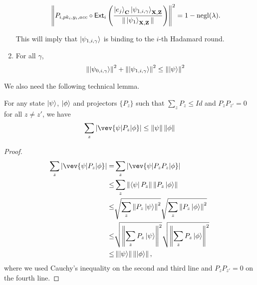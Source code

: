 \begin{lemma}
\begin{enumerate}
\begin{align}
     \left\lVert P_{i,pk_i,y_i,acc} \circ \mathsf{Ext}_i\left(\frac{\ket{e_j}_{\mathbf{C}}\ket{\psi_{1,i,\gamma}}_{\mathbf{X},\mathbf{Z}}}{\|\ket{\psi_1}_{\mathbf{X},\mathbf{Z}}\|}\right)\right\rVert^2 =1-\operatorname{negl}(\lambda).
\end{align}

This will imply that    $\ket{\psi_{1,i,\gamma}}$ is binding to the $i$-th Hadamard round.

\item \label{property-partition-norm-sum}
  For all $\gamma$,
  \begin{align}
    \left\lVert\ket{\psi_{0,i,\gamma}}\right\rVert^2+ \left\lVert\ket{\psi_{1,i,\gamma}}\right\rVert^2 \leq  \left\lVert\ket{\psi}\right\rVert^2
\end{align}

 

 


\end{enumerate}
\end{lemma}








We also need the following technical lemma.
\begin{lemma}\label{lem:samp-tech}
For any state $\ket{\psi}$,  $\ket{\phi}$ and projectors $\{P_z\}$ such that $\sum_z P_z \leq Id$ and $P_z P_{z'} =0 $ for all $z\neq z'$, we have
$$  \sum_z |\vev{\psi|P_z|\phi}| \leq \norm{\psi}\norm{\phi} $$
\end{lemma}
\begin{proof}
\begin{align}
    \sum_z |\vev{\psi|P_z|\phi}| =&\sum_z|\vev{\psi|P_zP_z|\phi}| \nn \\
    \leq& \sum_z \norm{\bra{\psi}P_z} \norm{ P_z\ket{\phi}} \nn \\
    \leq&  \sqrt{\sum_z \norm{P_z\ket{\psi}}^2} \sqrt{\sum_z\norm{P_z\ket{\phi}}^2} \nn \\
    \leq& \sqrt{\norm{\sum_z P_z\ket{\psi}}^2 } \sqrt{\norm{\sum_z P_z\ket{\phi}}^2 } \nn \\
    \leq & \norm{\ket{\psi}}\norm{\ket{\phi}},
\end{align}
where we used Cauchy's inequality on the second and third line and $P_z P_{z'} =0 $ on the fourth line.
\end{proof}

